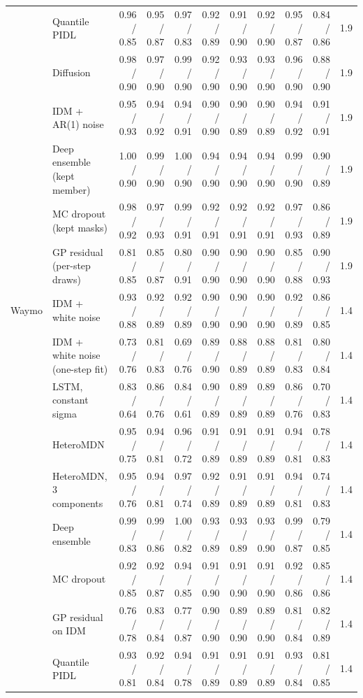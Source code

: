 \begin{longtable}{llrrrrrrrrr}
 & Quantile PIDL & 0.96 / 0.85 & 0.95 / 0.87 & 0.97 / 0.83 & 0.92 / 0.89 & 0.91 / 0.90 & 0.92 / 0.90 & 0.95 / 0.87 & 0.84 / 0.86 & 1.9 \\
 & Diffusion & 0.98 / 0.90 & 0.97 / 0.90 & 0.99 / 0.90 & 0.92 / 0.90 & 0.93 / 0.90 & 0.93 / 0.90 & 0.96 / 0.90 & 0.88 / 0.90 & 1.9 \\
 & IDM + AR(1) noise & 0.95 / 0.93 & 0.94 / 0.92 & 0.94 / 0.91 & 0.90 / 0.90 & 0.90 / 0.89 & 0.90 / 0.89 & 0.94 / 0.92 & 0.91 / 0.91 & 1.9 \\
 & Deep ensemble (kept member) & 1.00 / 0.90 & 0.99 / 0.90 & 1.00 / 0.90 & 0.94 / 0.90 & 0.94 / 0.90 & 0.94 / 0.90 & 0.99 / 0.90 & 0.90 / 0.89 & 1.9 \\
 & MC dropout (kept masks) & 0.98 / 0.92 & 0.97 / 0.93 & 0.99 / 0.91 & 0.92 / 0.91 & 0.92 / 0.91 & 0.92 / 0.91 & 0.97 / 0.93 & 0.86 / 0.89 & 1.9 \\
 & GP residual (per-step draws) & 0.81 / 0.85 & 0.85 / 0.87 & 0.80 / 0.91 & 0.90 / 0.90 & 0.90 / 0.90 & 0.90 / 0.90 & 0.85 / 0.88 & 0.90 / 0.93 & 1.9 \\
\midrule
Waymo & IDM + white noise & 0.93 / 0.88 & 0.92 / 0.89 & 0.92 / 0.89 & 0.90 / 0.90 & 0.90 / 0.90 & 0.90 / 0.90 & 0.92 / 0.89 & 0.86 / 0.85 & 1.4 \\
 & IDM + white noise (one-step fit) & 0.73 / 0.76 & 0.81 / 0.83 & 0.69 / 0.76 & 0.89 / 0.90 & 0.88 / 0.89 & 0.88 / 0.89 & 0.81 / 0.83 & 0.80 / 0.84 & 1.4 \\
 & LSTM, constant sigma & 0.83 / 0.64 & 0.86 / 0.76 & 0.84 / 0.61 & 0.90 / 0.89 & 0.89 / 0.89 & 0.89 / 0.89 & 0.86 / 0.76 & 0.70 / 0.83 & 1.4 \\
 & HeteroMDN & 0.95 / 0.75 & 0.94 / 0.81 & 0.96 / 0.72 & 0.91 / 0.89 & 0.91 / 0.89 & 0.91 / 0.89 & 0.94 / 0.81 & 0.78 / 0.83 & 1.4 \\
 & HeteroMDN, 3 components & 0.95 / 0.76 & 0.94 / 0.81 & 0.97 / 0.74 & 0.92 / 0.89 & 0.91 / 0.89 & 0.91 / 0.89 & 0.94 / 0.81 & 0.74 / 0.83 & 1.4 \\
 & Deep ensemble & 0.99 / 0.83 & 0.99 / 0.86 & 1.00 / 0.82 & 0.93 / 0.89 & 0.93 / 0.89 & 0.93 / 0.90 & 0.99 / 0.87 & 0.79 / 0.85 & 1.4 \\
 & MC dropout & 0.92 / 0.85 & 0.92 / 0.87 & 0.94 / 0.85 & 0.91 / 0.90 & 0.91 / 0.90 & 0.91 / 0.90 & 0.92 / 0.86 & 0.85 / 0.86 & 1.4 \\
 & GP residual on IDM & 0.76 / 0.78 & 0.83 / 0.84 & 0.77 / 0.87 & 0.90 / 0.90 & 0.89 / 0.90 & 0.89 / 0.90 & 0.81 / 0.84 & 0.82 / 0.89 & 1.4 \\
 & Quantile PIDL & 0.93 / 0.81 & 0.92 / 0.84 & 0.94 / 0.78 & 0.91 / 0.89 & 0.91 / 0.89 & 0.91 / 0.89 & 0.93 / 0.84 & 0.81 / 0.85 & 1.4 \\

\end{longtable}
